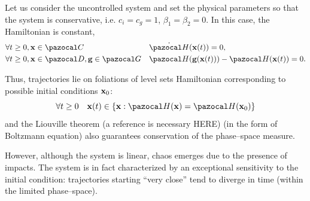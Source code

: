 %
Let us consider the uncontrolled system and set the physical parameters so that the system is conservative, i.e. $c_i = c_g = 1$, $\beta_1=\beta_2=0$. In this case, the Hamiltonian is constant,
%
\begin{align}
%
&\forall t\geq 0,\xb\in\C &&\dot{\Ha}(\xb(t)) = 0,\\
%
&\forall t\geq 0,\xb\in\D,\gb\in\G && \Ha(\gb(\xb(t)))-\Ha(\xb(t))=0.
%
\end{align}
%

Thus, trajectories lie on foliations of level sets Hamiltonian corresponding to possible initial conditions $\mathbf{x}_0$:
%
\begin{equation}
\forall t\geq 0 \quad \xb(t)\in\left\{\xb:\Ha(\xb) = \Ha(\x_0)\right\}
\end{equation}
%
and the Liouville theorem (a reference is necessary HERE) (in the form of Boltzmann equation) also guarantees conservation of the phase--space measure.
%

However, although the system is linear, chaos emerges due to the presence of impacts. The system is in fact characterized by an exceptional sensitivity to the initial condition: trajectories starting ``very close'' tend to diverge in time (within the limited phase--space).
%

